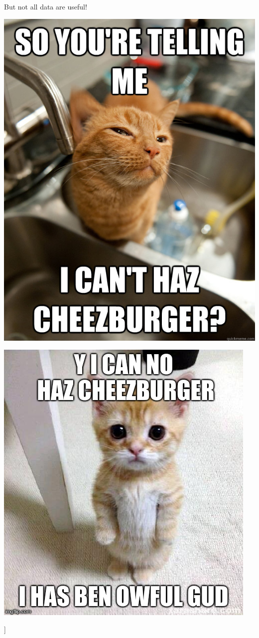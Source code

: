 \documentclass[
  ignorenonframetext,
]{beamer}
\begin{document}
\begin{frame}{But not all data are useful!}
\begin{center}\includegraphics[width=0.6\linewidth]{figures/cheezeburger3} \end{center}

\begin{center}\includegraphics[width=0.6\linewidth]{figures/cheezeburger4} \end{center}

\begin{block}{{]}}
\protect\hypertarget{section}{}
\end{block}
\end{frame}
\end{document}
